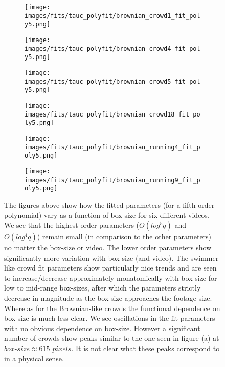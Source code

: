 \documentclass[10pt]{article}
\begin{document}
\begin{figure}[H]
\begin{subfigure}[t]{.5\textwidth}
  \centering
 \texttt{[image: images/fits/tauc\_polyfit/brownian\_crowd1\_fit\_poly5.png]}
  \caption{}
\end{subfigure}%
\hfill
\begin{subfigure}[t]{.5\textwidth}
  \centering
  \texttt{[image: images/fits/tauc\_polyfit/brownian\_crowd4\_fit\_poly5.png]}
  \caption{}
\end{subfigure}
\begin{subfigure}[t]{.5\textwidth}
  \centering
 \texttt{[image: images/fits/tauc\_polyfit/brownian\_crowd5\_fit\_poly5.png]}
  \caption{}
\end{subfigure}%
\hfill
\begin{subfigure}[t]{.5\textwidth}
  \centering
  \texttt{[image: images/fits/tauc\_polyfit/brownian\_crowd18\_fit\_poly5.png]}
  \caption{}
\end{subfigure}
\begin{subfigure}[t]{.5\textwidth}
  \centering
 \texttt{[image: images/fits/tauc\_polyfit/brownian\_running4\_fit\_poly5.png]}
  \caption{}
\end{subfigure}%
\hfill
\begin{subfigure}[t]{.5\textwidth}
  \centering
  \texttt{[image: images/fits/tauc\_polyfit/brownian\_running9\_fit\_poly5.png]}
  \caption{}
\end{subfigure}
\caption{The figures above show how the fitted parameters (for a fifth order polynomial) vary as a function of box-size for six different videos. We see that the highest order parameters ($O(log^5q)$ and $O(log^4q)$) remain small (in comparison to the other parameters) no matter the box-size or video. The lower order parameters show significantly more variation with box-size (and video). The swimmer-like crowd fit parameters show particularly nice trends and are seen to increase/decrease approximately monatomically with box-size for low to mid-range box-sizes, after which the parameters strictly decrease in magnitude as the box-size approaches the footage size. Where as for the Brownian-like crowds the functional dependence on box-size is much less clear. We see oscillations in the fit parameters with no obvious dependence on box-size. However a significant number of crowds show peaks similar to the one seen in figure (a) at $box$-$size \approx 615$ $pixels$. It is not clear what these peaks correspond to in a physical sense. }
\label{fig:tauc_polyfit_params}
\end{figure}
\end{document}
